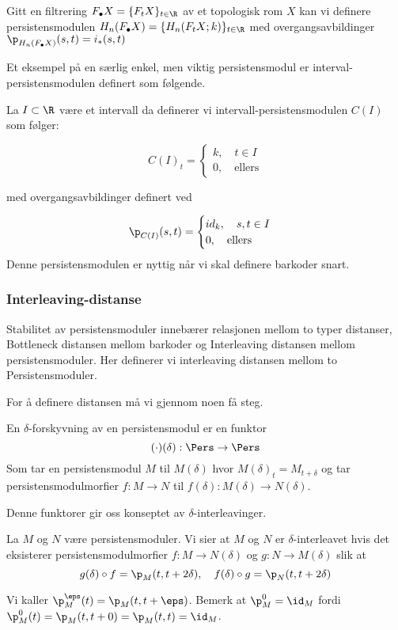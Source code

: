 \begin{example}\label{Ex:HomologiEks}
	Gitt en filtrering $F_\bullet X = \{F_tX\}_{t\in\R}$ av et topologisk rom $X$ kan vi definere persistensmodulen $H_n(F_\bullet X) = \{H_n(F_tX;k)\}_{t\in\R}$ med overgangsavbildinger $\p_{H_n(F_\bullet X)}(s,t) = i_*(s,t)$
\end{example}

Et eksempel på en særlig enkel, men viktig persistensmodul er interval-persistensmodulen definert som følgende.

La $I\subset\R$ være et intervall da definerer vi intervall-persistensmodulen $C(I)$ som følger:

\[C(I)_t = 
\begin{cases}
    k,\quad t\in I\\
0,\quad\text{ellers}
\end{cases}
\]

med overgangsavbildinger definert ved

\[\p_{C(I)}(s,t) = 
\begin{cases}
id_k,\quad s,t\in I\\
0, \quad\text{ellers}
\end{cases}
\]
Denne persistensmodulen er nyttig når vi skal definere barkoder snart.

\subsubsection{Interleaving-distanse}
Stabilitet av persistensmoduler innebærer relasjonen mellom to typer distanser, Bottleneck distansen mellom barkoder og Interleaving distansen mellom persistensmoduler. Her definerer vi interleaving distansen mellom to Persistensmoduler.

For å definere distansen må vi gjennom noen få steg.
\begin{definition}\label{Def:DShift}
	En $\delta$-forskyvning av en persistensmodul er en funktor
	\[(\cdot)(\delta): \Pers\to \Pers\]
	Som tar en persistensmodul $M$ til $M(\delta)$ hvor $M(\delta)_t = M_{t+\delta}$ og tar persistensmodulmorfier $f:M\to N$ til $f(\delta):M(\delta)\to N(\delta)$.
\end{definition}

Denne funktorer gir oss konseptet av $\delta$-interleavinger.

\begin{definition}\label{Def:interleaving}
	La $M$ og $N$ være persistensmoduler. Vi sier at $M$ og $N$ er $\delta$-interleavet hvis det eksisterer persistensmodulmorfier $f:M\to N(\delta)$ og $g:N\to M(\delta)$ slik at
	\[g(\delta)\circ f = \p_M(t,t+2\delta),\quad f(\delta)\circ g = \p_N(t,t+2\delta)\]
\end{definition}
Vi kaller $\p^\eps_M(t) = \p_M(t,t+\eps)$. Bemerk at $\p^0_M=\id_M$ fordi $\p^0_M(t) = \p_M(t,t+0)=\p_M(t,t)=\id_M$.

